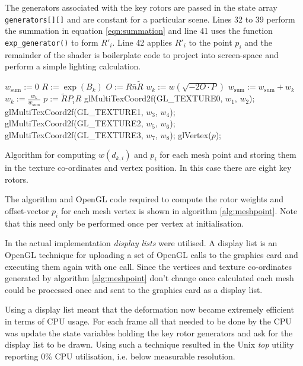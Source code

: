 The generators associated with the key rotors are passed in the state array {\tt generators[][]}
and are constant for a particular scene. Lines 32 to 39 perform the summation in 
equation \ref{eqn:summation} and line 41 uses the function {\tt exp\_generator()} to 
form $R'_i$. Line 42 applies $R'_i$ to the point $p_i$ and the remainder of the shader
is boilerplate code to project into screen-space and perform a simple lighting calculation.

\begin{fancyalg}
\begin{algorithmic}[1]
\STATE $w_{\mathrm{sum}} := 0$
\STATE $R := \exp(B_k)$
\STATE $O := R\bar{n}\tilde{R}$
\STATE $w_k := w(\sqrt{-2 O \cdot P})$
\STATE $w_{\mathrm{sum}} := w_{\mathrm{sum}} + w_k$
\ENDFOR
{}
\STATE $w_k := \frac{w_k}{w_{\mathrm{sum}}}$
\ENDFOR
\STATE $p := \tilde{R}P_iR$
\STATE glMultiTexCoord2f(GL\_TEXTURE0, $w_1$, $w_2$);
\STATE glMultiTexCoord2f(GL\_TEXTURE1, $w_3$, $w_4$); 
\STATE glMultiTexCoord2f(GL\_TEXTURE2, $w_5$, $w_6$);
\STATE glMultiTexCoord2f(GL\_TEXTURE3, $w_7$, $w_8$);
\STATE glVertex($p$);
\end{algorithmic}
\caption{\label{alg:meshpoint}Algorithm for computing $w(d_{k,i})$ and $p_i$ for 
  each mesh point and storing them in the texture co-ordinates and vertex position.
  In this case there are eight key rotors.}
\end{fancyalg}

The algorithm and OpenGL code required to compute the rotor weights and offset-vector
$p_i$ for each mesh vertex is shown in algorithm \ref{alg:meshpoint}. Note that this
need only be performed once per vertex at initialisation.

In the actual implementation \emph{display lists} were utilised. A display list 
is an OpenGL technique for uploading a set of OpenGL calls to the graphics card
and executing them again with one call. Since the vertices and texture co-ordinates
generated by algorithm \ref{alg:meshpoint} don't change once calculated each mesh could
be processed once and sent to the graphics card as a display list.

Using a display list meant that the deformation now became extremely efficient in
terms of CPU usage. For each frame all that needed to be done by the CPU was update the
state variables holding the key rotor generators and ask for the display list to be drawn.
Using such a technique resulted in the Unix \emph{top} utility reporting 0\% CPU utilisation,
i.e. below measurable resolution.

